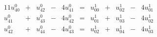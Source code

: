 \begin{alignat*}{11}
u_{40}^0 & {}+{} &  u_{42}^0 & {}-{} &  4u_{41}^0 & {}={} & u_{00}^1 & {}+{} &  u_{02}^1 & {}-{} &  4u_{01}^1\\
u_{41}^0 & {}+{} &  u_{43}^0 & {}-{} &  4u_{42}^0 & {}={} & u_{01}^1 & {}+{} &  u_{03}^1 & {}-{} &  4u_{02}^1\\
u_{42}^0 & {}+{} &  u_{44}^0 & {}-{} &  4u_{43}^0 & {}={} & u_{02}^1 & {}+{} &  u_{04}^1 & {}-{} &  4u_{03}^1
\end{alignat*}